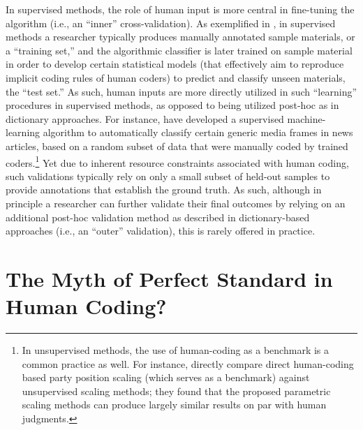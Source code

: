 \documentclass[man, floatsintext, 12pt, a4paper, noextraspace]{apa6}
\begin{document}
    In supervised methods, the role of human input is more central in fine-tuning the algorithm (i.e., an \enquote{inner} cross-validation). As exemplified in \textcite{scharkow2013thematic}, in supervised methods a researcher typically produces manually annotated sample materials, or a \enquote{training set,} and the algorithmic classifier is later trained on sample material in order to develop certain statistical models (that effectively aim to reproduce implicit coding rules of human coders) to predict and classify unseen materials, the \enquote{test set.} As such, human inputs are more directly utilized in such \enquote{learning} procedures in supervised methods, as opposed to being utilized post-hoc as in dictionary approaches. For instance, \textcite{burscher2014teaching} have developed a supervised machine-learning algorithm to automatically classify certain generic media frames in news articles, based on a random subset of data that were manually coded by trained coders.\footnote{ In unsupervised methods, the use of human-coding as a benchmark is a common practice as well. For instance, \textcite{lowe2013validating} directly compare direct human-coding based party position scaling (which serves as a benchmark) against unsupervised scaling methods; they found that the proposed parametric scaling methods can produce largely similar results on par with human judgments.} Yet due to inherent resource constraints associated with human coding, such validations typically rely on only a small subset of held-out samples to provide annotations that establish the ground truth. As such, although in principle a researcher can further validate their final outcomes by relying on an additional post-hoc validation method as described in dictionary-based approaches (i.e., an \enquote{outer} validation), this is rarely offered in practice.   
    
\section{The Myth of Perfect Standard in Human Coding?}
\end{document}
